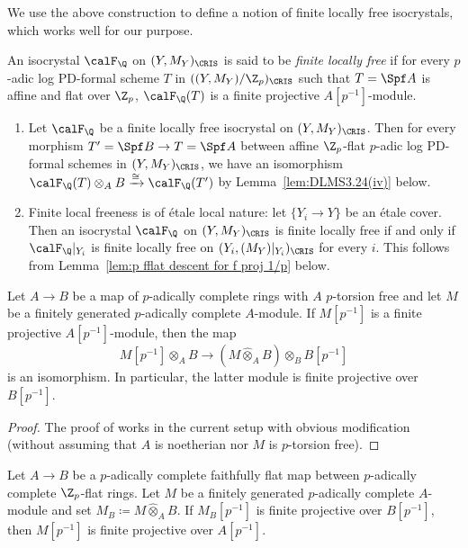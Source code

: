 We use the above construction to define a notion of finite locally free isocrystals, which works well for our purpose.

\begin{defn}
 An isocrystal $\calF_\Q$ on $(Y,M_Y)_\CRIS$ is said to be \emph{finite locally free} if for every $p$-adic log PD-formal scheme $T$ in $((Y,M_Y)/\Z_p)_\CRIS$ such that $T=\Spf A$ is affine and flat over $\Z_p$,  $\calF_{\Q}(T)$ is a finite projective $A[p^{-1}]$-module.
\end{defn}

\begin{rem}
\hfill
\begin{enumerate}
    \item 
Let $\calF_\Q$ be a finite locally free isocrystal on $(Y,M_Y)_\CRIS$. Then for every morphism $T'=\Spf B\rightarrow T=\Spf A$ between affine $\Z_p$-flat $p$-adic log PD-formal schemes in $(Y,M_Y)_\CRIS$, we have an isomorphism $\calF_\Q(T)\otimes_{A}B\xrightarrow{\cong}\calF_{\Q}(T')$ by Lemma~\ref{lem:DLMS3.24(iv)} below. 
    \item Finite local freeness is of \'etale local nature: let $\{Y_i\rightarrow Y\}$ be an \'etale cover. Then an isocrystal $\calF_\Q$ on $(Y,M_Y)_\CRIS$ is finite locally free if and only if  $\calF_\Q|_{Y_i}$ is finite locally free on $(Y_i,(M_Y)|_{Y_i})_\CRIS$ for every $i$. This follows from Lemma~\ref{lem:p fflat descent for f proj 1/p} below.
\end{enumerate}
\end{rem}

\begin{lem}\label{lem:DLMS3.24(iv)}
Let $A\rightarrow B$ be a map of $p$-adically complete rings with $A$ $p$-torsion free and let $M$ be a finitely generated $p$-adically complete $A$-module. If $M[p^{-1}]$ is a finite projective $A[p^{-1}]$-module, then the map
\[
M[p^{-1}]\otimes_AB\rightarrow (M\widehat{\otimes}_AB)\otimes_BB[p^{-1}]
\]
is an isomorphism. In particular, the latter module is finite projective over $B[p^{-1}]$.
\end{lem}

\begin{proof}
The proof of \cite[Lem.~3.24(iv)]{du-liu-moon-shimizu-completed-prismatic-F-crystal-loc-system} works in the current setup with obvious modification  (without assuming that $A$ is noetherian nor $M$ is $p$-torsion free).
\end{proof}

\begin{lem}\label{lem:p fflat descent for f proj 1/p}
Let $A\rightarrow B$ be a $p$-adically complete faithfully flat map between $p$-adically complete $\Z_p$-flat rings. Let $M$ be a finitely generated $p$-adically complete $A$-module and set $M_B \coloneqq M\widehat{\otimes}_A B$. If $M_{B}[p^{-1}]$ is finite projective over $B[p^{-1}]$, then $M[p^{-1}]$ is finite projective over $A[p^{-1}]$.
\end{lem}

